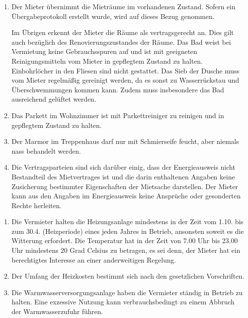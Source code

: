 \documentclass{scrreprt}[12pt,a4paper,twoside,duplex]
\begin{document}
\begin{contract}
\begin{enumerate}
\item Der Mieter übernimmt die Mieträume im vorhandenen Zustand. Sofern ein Übergabeprotokoll erstellt wurde, wird auf dieses Bezug genommen.

Im Übrigen erkennt der Mieter die Räume als vertragsgerecht an. Dies gilt auch bezüglich des Renovierungszustandes der Räume. Das Bad weist bei Vermietung keine Gebrauchsspuren auf und ist mit geeigneten Reinigungsmitteln vom Mieter in gepflegtem Zustand zu halten. Einbohrlöcher in den Fliesen sind nicht gestattet. Das Sieb der Dusche muss vom Mieter regelmäßig gereinigt werden, da es sonst zu Wasserrückstau und Überschwemmungen kommen kann. Zudem muss insbesondere das Bad ausreichend gelüftet werden.
\item Das Parkett im Wohnzimmer ist mit Parkettreiniger zu reinigen und in gepflegtem Zustand zu halten.
\item Der Marmor im Treppenhaus darf nur mit Schmierseife feucht, aber niemals nass behandelt werden.
\item Die Vertragsparteien sind sich darüber einig, dass der Energieausweis nicht Bestandteil des Mietvertrages ist und die darin enthaltenen Angaben keine Zusicherung bestimmter Eigenschaften der Mietsache darstellen. Der Mieter kann aus den Angaben im Energieausweis keine Ansprüche oder gesonderten Rechte herleiten.
\end{enumerate}
\end{contract}

\begin{contract}
	\begin{enumerate}
		\item Die Vermieter halten die Heizungsanlage mindestens in der Zeit vom 1.10. bis zum 30.4. (Heizperiode) eines jeden Jahres in Betrieb, ansonsten soweit es die Witterung erfordert. Die Temperatur hat in der Zeit von 7.00 Uhr bis 23.00 Uhr mindestens 20 Grad Celsius zu betragen, es sei denn, der Mieter hat ein berechtigtes Interesse an einer anderweitigen Regelung.

		\item Der Umfang der Heizkosten bestimmt sich nach den gesetzlichen Vorschriften.

		\item Die Warmwasserversorgungsanlage haben die Vermieter ständig in Betrieb zu halten. Eine exzessive Nutzung kann verbrauchsbedingt zu einem Abbruch der Warmwasserzufuhr führen.
	\end{enumerate}
\end{contract}
\end{document}
